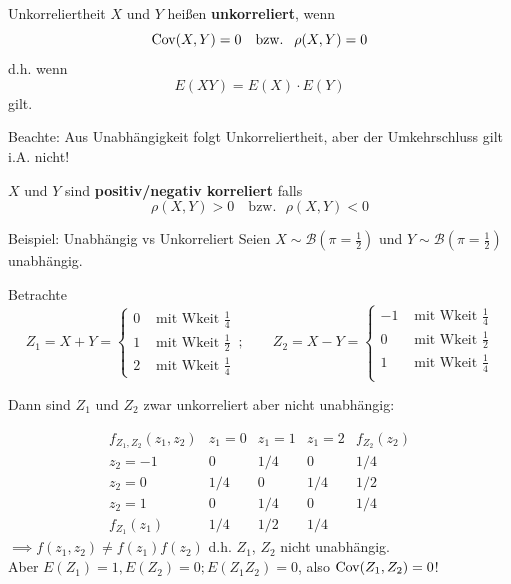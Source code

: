 \documentclass[
  10pt,
  ignorenonframetext,
]{beamer}
\begin{document}
\begin{frame}{Unkorreliertheit}
\label{unkorreliertheit}
\(X\) und \(Y\) heißen \textbf{unkorreliert}, wenn \[
\operatorname{Cov}(X,Y) = 0 \quad \mbox{bzw.~ } \rho(X,Y) = 0
\] d.h. wenn \[
E(XY) = E (X) \cdot E (Y)
\] gilt.

Beachte: Aus Unabhängigkeit folgt Unkorreliertheit, aber der
Umkehrschluss gilt i.A. nicht!

\(X\) und \(Y\) sind \textbf{positiv/negativ korreliert} falls \[
\rho(X,Y) > 0 \quad \mbox{bzw.~ } \rho(X,Y) < 0
\]

\end{frame}

\begin{frame}{Beispiel: Unabhängig vs Unkorreliert}
\label{beispiel-unabhuxe4ngig-vs-unkorreliert}
Seien \(X \sim {\mathcal B}(\pi = \frac{1}{2})\) und
\(Y \sim {\mathcal B}(\pi = \frac{1}{2})\) unabhängig.

Betrachte \[
Z_1  =   X + Y = \left \{ \begin{array}{rl}
0 & \mbox{ mit Wkeit }\frac{1}{4}\\
1 & \mbox{ mit Wkeit }\frac{1}{2}\\
2 & \mbox{ mit Wkeit }\frac{1}{4}
\end{array}
\right.\,;  \qquad 
Z_2 =   X - Y = \left \{ \begin{array}{rl}
-1 & \mbox{ mit Wkeit }\frac{1}{4}\\
0 & \mbox{ mit Wkeit }\frac{1}{2}\\
1 & \mbox{ mit Wkeit }\frac{1}{4}\\
\end{array}
\right.
\]

Dann sind \(Z_1\) und \(Z_2\) zwar unkorreliert aber nicht unabhängig:

\[\begin{array}{c|ccc|c}
f_{Z_1,Z_2}(z_1,z_2) & z_1 = 0 & z_1 = 1 & z_1 = 2 &
f_{Z_2}(z_2)\\ \hline 
z_2 = -1 & 0 & 1/4 & 0 & 1/4 \\
z_2 = 0 & 1/4 & 0 & 1/4 & 1/2 \\
z_2 = 1 & 0 & 1/4 & 0 & 1/4 \\ \hline
f_{Z_1}(z_1) & 1/4 & 1/2 & 1/4 & 
\end{array}\] \(\implies f(z_1,z_2) \neq f(z_1) f(z_2)\) d.h. \(Z_1\),
\(Z_2\) nicht unabhängig.\\
Aber \(E(Z_1) = 1, E(Z_2) = 0; E(Z_1 Z_2) = 0\), also
\(\operatorname{Cov}(Z_1,Z_2) = 0\)!
\end{frame}
\end{document}
